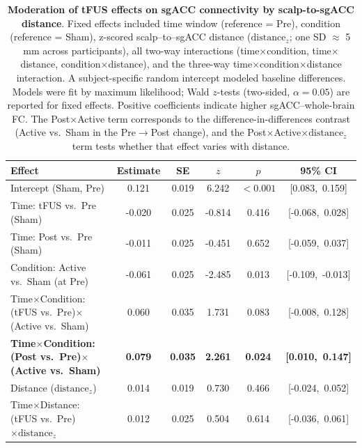 \begin{table}[t]
    \centering
    \small
    \caption{\textbf{Moderation of tFUS effects on sgACC connectivity by scalp-to-sgACC distance}. 
Fixed effects included time window (reference = Pre), condition (reference = Sham), z-scored scalp–to–sgACC distance ($\mathrm{distance}_z$; one SD $\approx$ 5\,mm across participants), all two-way interactions (time$\times$condition, time$\times$distance, condition$\times$distance), and the three-way time$\times$condition$\times$distance interaction. A subject-specific random intercept modeled baseline differences. Models were fit by maximum likelihood; Wald $z$-tests (two-sided, $\alpha=0.05$) are reported for fixed effects. Positive coefficients indicate higher sgACC–whole-brain FC. The Post$\times$Active term corresponds to the difference-in-differences contrast (Active vs.\ Sham in the Pre$\rightarrow$Post change), and the Post$\times$Active$\times\mathrm{distance}_z$ term tests whether that effect varies with distance.}
    \label{tab:distance_moderation_mixedlm}
    \setlength{\tabcolsep}{8pt}
    \begin{tabular}{lccccc}
    \toprule
    \textbf{Effect} & \textbf{Estimate} & \textbf{SE} & \textbf{$z$} & \textbf{$p$} & \textbf{95\% CI} \\
    \midrule
    Intercept (Sham, Pre)                                             & 0.121 & 0.019 &  6.242 & $<\!0.001$ & [0.083,\ 0.159] \\
    Time: tFUS vs.\ Pre (Sham)                                       &-0.020 & 0.025 & -0.814 & 0.416      & [-0.068,\ 0.028] \\
    Time: Post vs.\ Pre (Sham)                                       &-0.011 & 0.025 & -0.451 & 0.652      & [-0.059,\ 0.037] \\
    Condition: Active vs.\ Sham (at Pre)                             &-0.061 & 0.025 & -2.485 & 0.013      & [-0.109,\ -0.013] \\
    Time$\times$Condition: (tFUS vs.\ Pre)$\times$(Active vs.\ Sham) & 0.060 & 0.035 &  1.731 & 0.083      & [-0.008,\ 0.128] \\
    \textbf{Time$\times$Condition: (Post vs.\ Pre)$\times$(Active vs.\ Sham)} & \textbf{0.079} & \textbf{0.035} &  \textbf{2.261} & \textbf{0.024}      & \textbf{[0.010,\ 0.147]} \\
    \addlinespace[3pt]
    Distance ($\mathrm{distance}_z$)                                  & 0.014 & 0.019 &  0.730 & 0.466      & [-0.024,\ 0.052] \\
    Time$\times$Distance: (tFUS vs.\ Pre)$\times \mathrm{distance}_z$ & 0.012 & 0.025 &  0.504 & 0.614      & [-0.036,\ 0.061] \\

\end{tabular}
\end{table}
